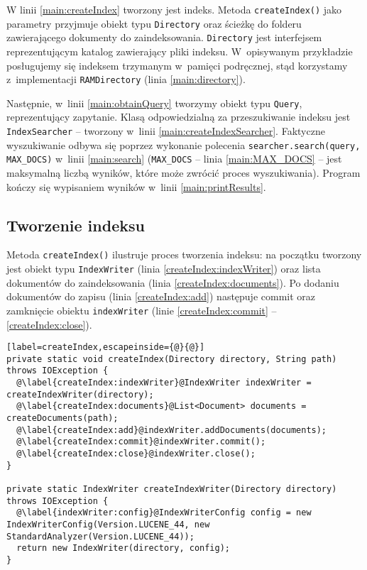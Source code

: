 W linii \ref{main:createIndex} tworzony jest indeks. Metoda \texttt{createIndex()} jako parametry przyjmuje obiekt typu \texttt{Directory} oraz ścieżkę do folderu zawierającego dokumenty do zaindeksowania. \texttt{Directory} jest interfejsem reprezentującym katalog zawierający pliki indeksu. W~opisywanym przykładzie posługujemy się indeksem trzymanym w~pamięci podręcznej, stąd korzystamy z~implementacji \texttt{RAMDirectory} (linia \ref{main:directory}).

Następnie, w~linii \ref{main:obtainQuery} tworzymy obiekt typu \texttt{Query}, reprezentujący zapytanie. Klasą odpowiedzialną za przeszukiwanie indeksu jest \texttt{IndexSearcher} -- tworzony w~linii \ref{main:createIndexSearcher}. Faktyczne wyszukiwanie odbywa się poprzez wykonanie polecenia \texttt{searcher.search(query, MAX\_DOCS)} w~linii \ref{main:search} (\texttt{MAX\_DOCS} -- linia \ref{main:MAX_DOCS} -- jest maksymalną liczbą wyników, które może zwrócić proces wyszukiwania). Program kończy się wypisaniem wyników w~linii \ref{main:printResults}.

\subsection{Tworzenie indeksu}

Metoda \texttt{createIndex()} ilustruje proces tworzenia indeksu: na początku tworzony jest obiekt typu \texttt{IndexWriter} (linia \ref{createIndex:indexWriter}) oraz lista dokumentów do zaindeksowania (linia \ref{createIndex:documents}). Po dodaniu dokumentów do zapisu (linia \ref{createIndex:add}) następuje commit oraz zamknięcie obiektu \texttt{indexWriter} (linie \ref{createIndex:commit} -- \ref{createIndex:close}).

\begin{lstlisting}[label=createIndex,escapeinside={@}{@}]
private static void createIndex(Directory directory, String path) throws IOException {
  @\label{createIndex:indexWriter}@IndexWriter indexWriter = createIndexWriter(directory);
  @\label{createIndex:documents}@List<Document> documents = createDocuments(path);
  @\label{createIndex:add}@indexWriter.addDocuments(documents);
  @\label{createIndex:commit}@indexWriter.commit();
  @\label{createIndex:close}@indexWriter.close();
}

private static IndexWriter createIndexWriter(Directory directory) throws IOException {
  @\label{indexWriter:config}@IndexWriterConfig config = new IndexWriterConfig(Version.LUCENE_44, new StandardAnalyzer(Version.LUCENE_44));
  return new IndexWriter(directory, config);
}
\end{lstlisting}

